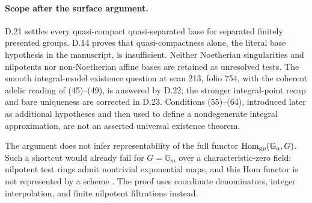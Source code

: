 \paragraph{Scope after the surface argument.}
D.21 settles every quasi-compact quasi-separated base for separated
finitely presented groups. D.14 proves that quasi-compactness
alone, the literal base hypothesis in the manuscript, is
insufficient. Neither Noetherian singularities and nilpotents
nor non-Noetherian affine bases are retained as unresolved tests.
The smooth integral-model existence question at scan 213, folio 754,
with the coherent adelic reading of (45)--(49), is answered by D.22;
the stronger integral-point recap and bare uniqueness are corrected
in D.23. Conditions (55)--(64), introduced later
as additional hypotheses and then used to define a nondegenerate
integral approximation, are not an asserted universal existence
theorem.

The argument does not infer representability of the full functor
$\operatorname{Hom}_{\rm gp}(\mathbb G_a,G)$. Such a shortcut
would already fail for $G=\mathbb G_m$ over a characteristic-zero
field: nilpotent test rings admit nontrivial exponential maps,
and this Hom functor is not represented by a scheme
\citep[p.~2]{DS_BrionHom}. The proof uses coordinate denominators,
integer interpolation, and finite nilpotent filtrations instead.
